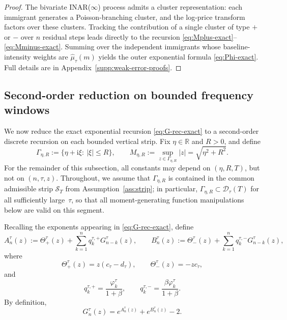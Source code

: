\documentclass[letterpaper]{article}
\numberwithin{equation}{section}
\theoremstyle{definition}
\theoremstyle{remark}
\newcommand{\ii}{\mathrm{i}}
\begin{document}
\begin{proof}
{The bivariate INAR($\infty$) process admits a cluster representation: each immigrant generates a Poisson-branching cluster, and the log-price transform factors over these clusters. Tracking the contribution of a single cluster of type $+$ or $-$ over $n$ residual steps leads directly to the recursion \eqref{eq:Mplus-exact}--\eqref{eq:Mminus-exact}. Summing over the independent immigrants whose baseline-intensity weights are $\hat\mu_\tau(m)$ yields the outer exponential formula \eqref{eq:Phi-exact}.} Full details are in Appendix~\ref{supp:weak-error-proofs}.
\end{proof}


\subsection{Second-order reduction on bounded frequency windows}
\label{subsec:second-order-reduction}

We now reduce the exact exponential recursion
\eqref{eq:G-rec-exact} to a second-order discrete recursion on each bounded vertical strip. Fix $\eta\in\mathbb R$ and $R>0$, and define
\[
  \Gamma_{\eta,R}:=\{\eta+\ii \xi:\ |\xi|\le R\},
  \qquad
  M_{\eta,R}:=\sup_{z\in\Gamma_{\eta,R}}|z|=\sqrt{\eta^2+R^2}.
\]
For the remainder of this subsection, all constants may depend on $(\eta,R,T)$, but not on $(n,\tau,z)$.
Throughout, we assume that $\Gamma_{\eta,R}$ is contained in the common admissible strip $\mathcal S_T$ from Assumption~\ref{ass:strip}; in particular, $\Gamma_{\eta,R}\subset\mathcal D_\tau(T)$ for all sufficiently large~$\tau$, so that all moment-generating function manipulations below are valid on this segment.

Recalling the exponents appearing in \eqref{eq:G-rec-exact}, define
\begin{equation}\label{eq:AB-def-new33}
  A_n^\tau(z)
  :=\Theta_+^\tau(z)+\sum_{k=1}^n q_k^{\tau,+}G_{n-k}^\tau(z),
  \qquad
  B_n^\tau(z)
  :=\Theta_-^\tau(z)+\sum_{k=1}^n q_k^{\tau,-}G_{n-k}^\tau(z),
\end{equation}
where
\[
  \Theta_+^\tau(z)=z(c_\tau-d_\tau),
  \qquad
  \Theta_-^\tau(z)=-zc_\tau,
\]
and
\[
  q_k^{\tau,+}=\frac{\varphi_k^\tau}{1+\beta},
  \qquad
  q_k^{\tau,-}=\frac{\beta\varphi_k^\tau}{1+\beta}.
\]
By definition,
\begin{equation}\label{eq:G-from-AB-new33}
  G_n^\tau(z)=e^{A_n^\tau(z)}+e^{B_n^\tau(z)}-2.
\end{equation}
\end{document}
